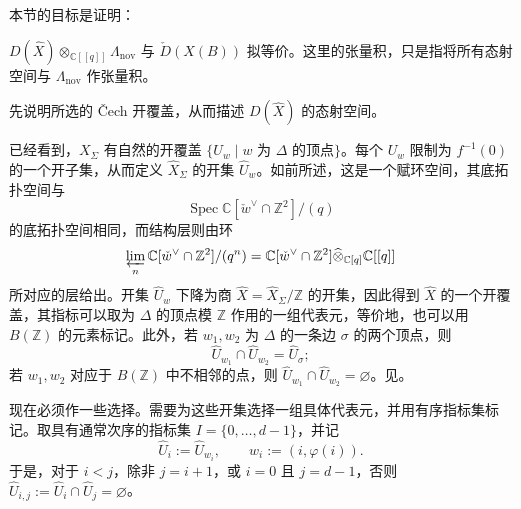 本节的目标是证明：
\begin{theorem}\label{thm:8.24}
$D(\widehat X)\otimes_{\mathbb C[[q]]}\Lambda_{\mathrm{nov}}$ 与 $\check D(X(B))$ 拟等价。这里的张量积，只是指将所有态射空间与 $\Lambda_{\mathrm{nov}}$ 作张量积。
\end{theorem}

先说明所选的 \v{C}ech 开覆盖，从而描述 $D(\widehat X)$ 的态射空间。

已经看到，$X_\Sigma$ 有自然的开覆盖 $\{U_w\mid w\text{ 为 }\Delta\text{ 的顶点}\}$。每个 $U_w$ 限制为 $f^{-1}(0)$ 的一个开子集，从而定义 $\widehat X_\Sigma$ 的开集 $\widehat U_w$。如前所述，这是一个赋环空间，其底拓扑空间与
\[
\operatorname{Spec}\mathbb C[\check w^\vee\cap\mathbb Z^2]/(q)
\]
的底拓扑空间相同，而结构层则由环
\[
\varprojlim_n\mathbb C[\check w^\vee\cap\mathbb Z^2]/(q^n)
=\mathbb C[\check w^\vee\cap\mathbb Z^2]
\widehat\otimes_{\mathbb C[q]}\mathbb C[[q]]
\]
所对应的层给出。开集 $\widehat U_w$ 下降为商 $\widehat X=\widehat X_\Sigma/\mathbb Z$ 的开集，因此得到 $\widehat X$ 的一个开覆盖，其指标可以取为 $\Delta$ 的顶点模 $\mathbb Z$ 作用的一组代表元，等价地，也可以用 $B(\mathbb Z)$ 的元素标记。此外，若 $w_1,w_2$ 为 $\Delta$ 的一条边 $\sigma$ 的两个顶点，则
\[
\widehat U_{w_1}\cap\widehat U_{w_2}=\widehat U_\sigma;
\]
若 $w_1,w_2$ 对应于 $B(\mathbb Z)$ 中不相邻的点，则 $\widehat U_{w_1}\cap\widehat U_{w_2}=\varnothing$。见。
\begin{figure}[H]
\centering
{}
\BookNumberOnlyCaption\label{fig:8.36}
\end{figure}

现在必须作一些选择。需要为这些开集选择一组具体代表元，并用有序指标集标记。取具有通常次序的指标集 $I=\{0,\ldots,d-1\}$，并记
\[
\widehat U_i:=\widehat U_{w_i},
\qquad w_i:=(i,\varphi(i)).
\]
于是，对于 $i<j$，除非 $j=i+1$，或 $i=0$ 且 $j=d-1$，否则 $\widehat U_{i,j}:=\widehat U_i\cap\widehat U_j=\varnothing$。

